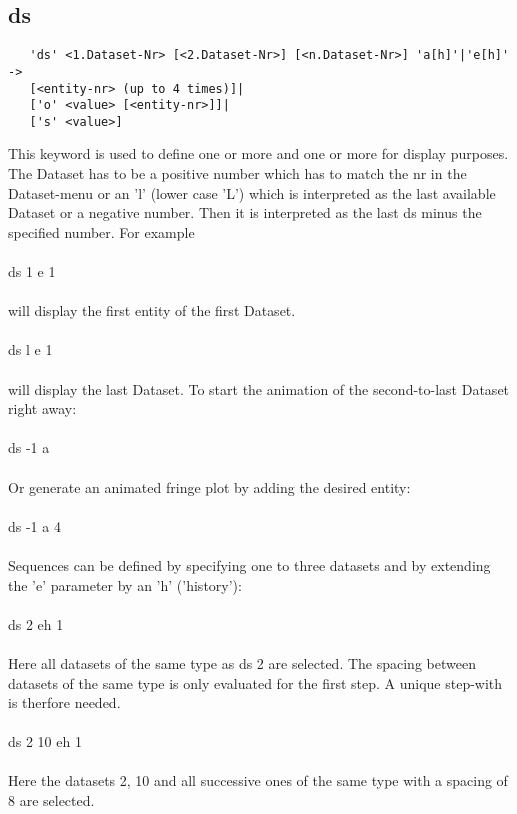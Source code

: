 \documentclass{article}
\begin{document}
\subsection{\label{ds}ds}
\begin{verbatim}
   'ds' <1.Dataset-Nr> [<2.Dataset-Nr>] [<n.Dataset-Nr>] 'a[h]'|'e[h]' ->
   [<entity-nr> (up to 4 times)]|
   ['o' <value> [<entity-nr>]]|
   ['s' <value>] 
\end{verbatim}
This keyword is used to define one or more  and one or more  for display purposes. The Dataset has to be a positive number which has to match the nr in the Dataset-menu or an 'l' (lower case 'L') which is interpreted as the last available Dataset or a negative number. Then it is interpreted as the last ds minus the specified number. For example\\\\
ds 1 e 1\\\\
will display the first entity of the first Dataset.\\\\
ds l e 1\\\\
will display the last Dataset.
To start the animation of the second-to-last Dataset right away:\\\\
ds -1 a\\\\
Or generate an animated fringe plot by adding the desired entity:\\\\
ds -1 a 4\\\\
Sequences can be defined by specifying one to three datasets and by extending the 'e' parameter by an 'h' ('history'):\\\\
ds 2 eh 1\\\\
Here all datasets of the same type as ds 2 are selected. The spacing between datasets of the same type is only evaluated for the first step. A unique step-with is therfore needed.\\\\
ds 2 10 eh 1\\\\
Here the datasets 2, 10 and all successive ones of the same type with a spacing of 8 are selected.\\\\
\end{document}
